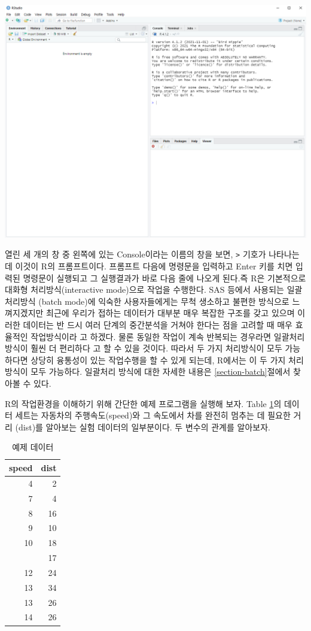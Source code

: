 \documentclass[
]{book}
\begin{document}
\includegraphics[width=16.62in]{Figure/ch1_RStudio_first}

열린 세 개의 창 중 왼쪽에 있는 Console이라는 이름의 창을 보면, \texttt{\textgreater{}}
기호가 나타나는 데 이것이 R의 프롬프트이다. 프롬프트 다음에 명령문을
입력하고 Enter 키를 치면 입력된 명령문이 실행되고 그 실행결과가 바로
다음 줄에 나오게 된다.즉 R은 기본적으로 대화형 처리방식(interactive
mode)으로 작업을 수행한다. SAS 등에서 사용되는 일괄처리방식 (batch
mode)에 익숙한 사용자들에게는 무척 생소하고 불편한 방식으로 느껴지겠지만
최근에 우리가 접하는 데이터가 대부분 매우 복잡한 구조를 갖고 있으며
이러한 데이터는 반 드시 여러 단계의 중간분석을 거쳐야 한다는 점을 고려할
때 매우 효율적인 작업방식이라 고 하겠다. 물론 동일한 작업이 계속
반복되는 경우라면 일괄처리방식이 훨씬 더 편리하다 고 할 수 있을 것이다.
따라서 두 가지 처리방식이 모두 가능하다면 상당히 융통성이 있는
작업수행을 할 수 있게 되는데, R에서는 이 두 가지 처리방식이 모두
가능하다. 일괄처리 방식에 대한 자세한 내용은 \ref{section-batch}절에서
찾아볼 수 있다.

R의 작업환경을 이해하기 위해 간단한 예제 프로그램을 실행해 보자. Table
\ref{tab:exdata}의 데이터 세트는 자동차의 주행속도(speed)와 그 속도에서
차를 완전히 멈추는 데 필요한 거리 (dist)를 알아보는 실험 데이터의
일부분이다. 두 변수의 관계를 알아보자.

\begin{table}

\caption{\label{tab:exdata}예제 데이터}
\centering
\begin{tabular}[t]{rr}
\toprule
speed & dist\\
\midrule
4 & 2\\
7 & 4\\
8 & 16\\
9 & 10\\
10 & 18\\
\addlinespace
11 & 17\\
12 & 24\\
13 & 34\\
13 & 26\\
14 & 26\\
\bottomrule
\end{tabular}
\end{table}
\end{document}
